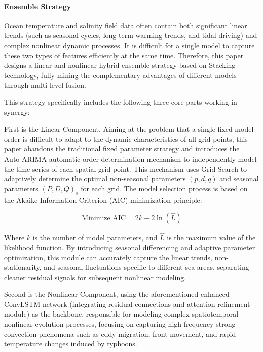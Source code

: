 \documentclass[webpdf,contemporary,large]{oup-authoring-template}
\begin{document}
\paragraph{Ensemble Strategy}

Ocean temperature and salinity field data often contain both significant linear trends (such as seasonal cycles, long-term warming trends, and tidal driving) and complex nonlinear dynamic processes. It is difficult for a single model to capture these two types of features efficiently at the same time. Therefore, this paper designs a linear and nonlinear hybrid ensemble strategy based on Stacking technology, fully mining the complementary advantages of different models through multi-level fusion.

This strategy specifically includes the following three core parts working in synergy:

First is the Linear Component. Aiming at the problem that a single fixed model order is difficult to adapt to the dynamic characteristics of all grid points, this paper abandons the traditional fixed parameter strategy and introduces the Auto-ARIMA automatic order determination mechanism to independently model the time series of each spatial grid point. This mechanism uses Grid Search to adaptively determine the optimal non-seasonal parameters $(p,d,q)$ and seasonal parameters $(P,D,Q)_s$ for each grid. The model selection process is based on the Akaike Information Criterion (AIC) minimization principle:

\begin{equation}
\text{Minimize } \text{AIC} = 2k - 2\ln(\hat{L})
\end{equation}

Where $k$ is the number of model parameters, and $\hat{L}$ is the maximum value of the likelihood function. By introducing seasonal differencing and adaptive parameter optimization, this module can accurately capture the linear trends, non-stationarity, and seasonal fluctuations specific to different sea areas, separating cleaner residual signals for subsequent nonlinear modeling.

Second is the Nonlinear Component, using the aforementioned enhanced ConvLSTM network (integrating residual connections and attention refinement module) as the backbone, responsible for modeling complex spatiotemporal nonlinear evolution processes, focusing on capturing high-frequency strong convection phenomena such as eddy migration, front movement, and rapid temperature changes induced by typhoons.
\end{document}
